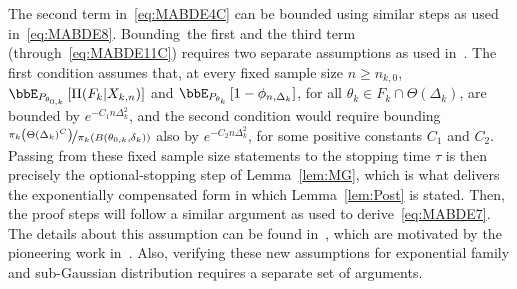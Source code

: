 \documentclass[11pt]{article}
\begin{document}
The second term in~\eqref{eq:MABDE4C} can be bounded using similar steps as used in~\eqref{eq:MABDE8}. Bounding~the first and the third term (through~\eqref{eq:MABDE11C}) requires two separate assumptions as used in~\cite{GGV,ZG,Yang2020}. The first condition assumes that, at every fixed sample size $n \geq n_{k,0}$, $\bbE_{P_{\theta_{0,k}}}\left[\Pi(F_k|X_{k,n})\right]$ and $\bbE_{P_{\theta_k}} \left[ 1-\phi_{n,\Delta_k}\right]$, for all $\theta_k \in F_k\cap \Theta(\Delta_k)$, are bounded by $e^{-C_1 n\Delta_k^2}$, and the second condition would require bounding $\nicefrac{\pi_k\left(\Theta(\Delta_k)^C\right)}{\pi_k(B\left(\theta_{0,k},\delta_k \right))}$ also by $e^{-C_2 n\Delta_k^2}$, for some positive constants $C_1$ and $C_2$. Passing from these fixed sample size statements to the stopping time $\tau$ is then precisely the optional-stopping step of Lemma~\ref{lem:MG}, which is what delivers the exponentially compensated form in which Lemma~\ref{lem:Post} is stated. Then, the proof steps will follow a similar argument as used to derive~\eqref{eq:MABDE7}. The details about this assumption can be found in~\cite {ZG,Yang2020}, which are motivated by the pioneering work in~\cite{GGV}. Also, verifying these new assumptions for exponential family and sub-Gaussian distribution requires a separate set of arguments.
\end{document}
